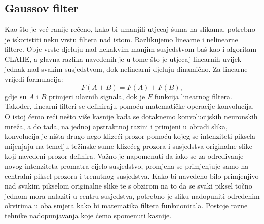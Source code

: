 \documentclass[times, utf8, diplomski]{fer}
\begin{document}
\subsection{Gaussov filter}
Kao što je već ranije rečeno, kako bi umanjili utjecaj šuma na slikama, potrebno je iskoristiti neku vrstu filtera nad istom. Razlikujemo linearne i nelinearne filtere. Obje vrste djeluju nad nekakvim manjim susjedstvom baš kao i algoritam CLAHE, a glavna razlika navedenih je u tome što je utjecaj linearnih uvijek jednak nad svakim susjedstvom, dok nelinearni djeluju dinamično. Za linearne vrijedi formulacija:
\begin{equation}
    F(A+B) = F(A) + F(B),
\end{equation}
gdje su $A$ i $B$ primjeri ulaznih signala, dok je $F$ funkcija linearnog filtera. Također, linearni filteri se definiraju pomoću matematičke operacije konvolucija. O istoj ćemo reći nešto više kasnije kada se dotaknemo konvolucijskih neuronskih mreža, a do tada, na jednoj apstraktnoj razini i primjeni u obradi slika, konvolucija je ništa drugo nego klizeći prozor pomoću kojeg se intenziteti piksela mijenjaju na temelju težinske sume klizećeg prozora i susjedstva originalne slike koji navedeni prozor definira. Važno je napomenuti da iako se za određivanje novog intenziteta promatra cijelo susjedstvo, promjena se primjenjuje samo na centralni piksel prozora i trenutnog susjedstva. Kako bi navedeno bilo primjenjivo nad svakim pikselom originalne slike te s obzirom na to da se svaki piksel točno jednom mora nalaziti u centru susjedstva, potrebno je sliku nadopuniti određenim okvirima u oba smjera kako bi matematika filtera funkcionirala. Postoje razne tehnike nadopunjavanja koje ćemo spomenuti kasnije.
\end{document}
